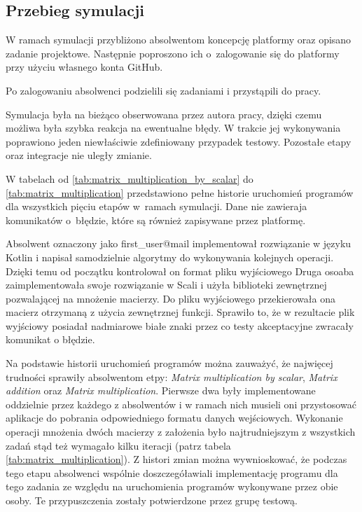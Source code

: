 \subsection{Przebieg symulacji}
\label{matrix_simulation}

W ramach symulacji przybliżono absolwentom koncepcję platformy oraz opisano zadanie projektowe.
Następnie poproszono ich o~zalogowanie się do platformy przy użyciu własnego konta GitHub.

Po zalogowaniu absolwenci podzielili się zadaniami i przystąpili do pracy.

Symulacja była na bieżąco obserwowana przez autora pracy, dzięki czemu możliwa była szybka reakcja na ewentualne błędy.
W trakcie jej wykonywania poprawiono jeden niewłaściwie zdefiniowany przypadek testowy.
Pozostałe etapy oraz integracje nie uległy zmianie.

W tabelach od \ref{tab:matrix_multiplication_by_scalar} do \ref{tab:matrix_multiplication} przedstawiono pełne historie uruchomień programów dla wszystkich pięciu etapów w~ramach symulacji.
Dane nie zawieraja komunikatów o~błędzie, które są również zapisywane przez platformę.

Absolwent oznaczony jako first\_user@mail implementował rozwiązanie w języku Kotlin i napisał samodzielnie algorytmy do wykonywania kolejnych operacji.
Dzięki temu od początku kontrolował on format pliku wyjściowego
Druga osoaba zaimplementowała swoje rozwiązanie w Scali i użyła biblioteki zewnętrznej pozwalającej na mnożenie macierzy.
Do pliku wyjściowego przekierowała ona macierz otrzymaną z użycia zewnętrznej funkcji.
Sprawiło to, że w rezultacie plik wyjściowy posiadał nadmiarowe białe znaki przez co testy akceptacyjne zwracały komunikat o błędzie.











Na podstawie historii uruchomień programów można zauważyć, że najwięcej trudności sprawiły absolwentom etpy: \textit{Matrix multiplication by scalar}, \textit{Matrix addition} oraz \textit{Matrix multiplication}.
Pierwsze dwa były implementowane oddzielnie przez każdego z absolwentów i w ramach nich musieli oni przystosować aplikacje do pobrania odpowiedniego formatu danych wejściowych.
Wykonanie operacji mnożenia dwóch macierzy z założenia było najtrudniejszym z wszystkich zadań stąd też wymagało kilku iteracji (patrz tabela \ref{tab:matrix_multiplication}).
Z histori zmian można wywnioskować, że podczas tego etapu absolwenci wspólnie doszczegóławiali implementację programu dla tego zadania ze względu na uruchomienia programów wykonywane przez obie osoby.
Te przypuszczenia zostały potwierdzone przez grupę testową.

